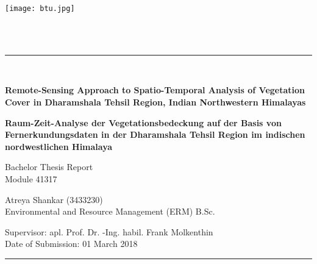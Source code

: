 \begin{titlepage}
	
        \vspace*{\fill}
        \vspace{-3cm}
        \begin{minipage}{6.9cm}
        	\hspace{-0.6cm}
        	\texttt{[image: btu.jpg]}
        \end{minipage}
       	\hspace{-1.5cm}
        \begin{minipage}{12.0cm}
        	\fontsize{12pt}{1pt}
        \end{minipage}\\
        \vspace{0.2cm}\\
        \rule{\textwidth}{0.5pt}\\
        \begin{center}
		\LARGE
		\textbf{Remote-Sensing Approach to Spatio-Temporal Analysis of Vegetation Cover in Dharamshala Tehsil Region, Indian Northwestern Himalayas}
		
		\vspace{1cm}
		
		\textbf{Raum-Zeit-Analyse der Vegetationsbedeckung auf der Basis von Fernerkundungsdaten in der Dharamshala Tehsil Region im indischen nordwestlichen Himalaya}
		
		\vspace{1cm}
		
		\LARGE
        Bachelor Thesis Report\\[0.2cm]
        Module 41317
		
		\vspace{1cm}
		
		Atreya Shankar (3433230)\\
		Environmental and Resource Management (ERM) B.Sc.

		\vspace{1cm}
		
	    \Large
		Supervisor: apl. Prof. Dr. -Ing. habil. Frank Molkenthin \\
		Date of Submission: 01 March 2018\\
		\vspace{0.5cm}
		\rule{\textwidth}{0.5pt}\\
		\vspace*{\fill}
	\end{center}
\end{titlepage}

